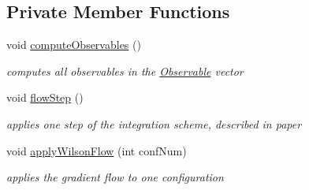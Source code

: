 \subsection*{Private Member Functions}
\begin{DoxyCompactItemize}
\item 
void \hyperlink{classWilsonFlow_aa9e371b2e2b8b1a24b372030dea6859b}{compute\+Observables} ()\hypertarget{classWilsonFlow_aa9e371b2e2b8b1a24b372030dea6859b}{}\label{classWilsonFlow_aa9e371b2e2b8b1a24b372030dea6859b}

\begin{DoxyCompactList}\small\item\em computes all observables in the \hyperlink{classObservable}{Observable} vector \end{DoxyCompactList}\item 
void \hyperlink{classWilsonFlow_aee1b088e9560a35e72a79d2cafc433c6}{flow\+Step} ()\hypertarget{classWilsonFlow_aee1b088e9560a35e72a79d2cafc433c6}{}\label{classWilsonFlow_aee1b088e9560a35e72a79d2cafc433c6}

\begin{DoxyCompactList}\small\item\em applies one step of the integration scheme, described in paper \end{DoxyCompactList}\item 
void \hyperlink{classWilsonFlow_ae24fd21ddd2c6703b1cb02245dd20138}{apply\+Wilson\+Flow} (int conf\+Num)
\begin{DoxyCompactList}\small\item\em applies the gradient flow to one configuration \end{DoxyCompactList}\end{DoxyCompactItemize}
